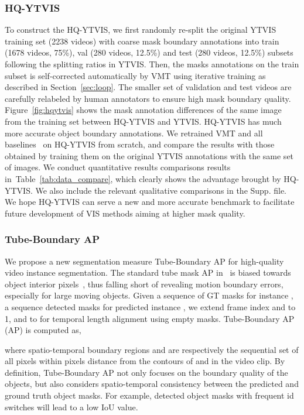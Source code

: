 \documentclass[runningheads]{llncs}
\begin{document}
\subsubsection{HQ-YTVIS}To construct the HQ-YTVIS, we first randomly re-split the original YTVIS training set (2238 videos) with coarse mask boundary annotations into train (1678 videos, 75\%), val (280 videos, 12.5\%) and test (280 videos, 12.5\%) subsets following the splitting ratios in YTVIS. 
Then, the masks annotations on the train subset is self-corrected automatically by VMT using iterative training as described in Section~\ref{sec:loop}. The smaller set of validation and test videos are carefully relabeled by human annotators to ensure high mask boundary quality. Figure~\ref{fig:hqytvis} shows the mask annotation differences of the same image from the training set between HQ-YTVIS and YTVIS. HQ-YTVIS has much more accurate object boundary annotations. We retrained VMT and all baselines~\cite{yang2019video, wang2020end, pcan, Yang_2021_ICCV,Fang_2021_ICCV,hwang2021video} on HQ-YTVIS from scratch, and compare the results with those obtained by training them on the original YTVIS annotations with the same set of images. We conduct quantitative results comparisons results in~Table~\ref{tab:data_compare}, which clearly shows the advantage brought by HQ-YTVIS.
We also include the relevant qualitative comparisons in the Supp. file.
We hope HQ-YTVIS can serve a new and more accurate benchmark to facilitate future development of VIS methods aiming at higher mask quality.


\subsubsection{Tube-Boundary AP} 
We propose a new segmentation measure Tube-Boundary AP for high-quality video instance segmentation. The standard tube mask AP in~\cite{yang2019video} is biased towards object interior pixels~\cite{kirillov2020pointrend,cheng2021boundary}, thus falling short of revealing motion boundary errors, especially for large moving objects.
Given a sequence of GT masks  for instance ,  a sequence detected masks  for predicted instance , we extend frame index  and  to 1,  and  to  for temporal length alignment using empty masks. Tube-Boundary AP (AP) is computed as,

where spatio-temporal boundary regions  and  are respectively the sequential set of all pixels within  pixels distance from the contours of  and  in the video clip.
By definition, Tube-Boundary AP not only focuses on the boundary quality of the objects, but also considers spatio-temporal consistency between the predicted and ground truth object masks. For example, detected object masks with frequent id switches will lead to a low IoU value. 
\end{document}
